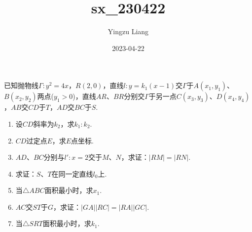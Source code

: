 \documentclass[UTF8, 12pt, a4paper]{ctexart}
\title{sx_230422}
\author{Yingzu Liang}
\date{2023-04-22}
\begin{document}
已知抛物线$\Gamma:y^2=4x$，$R\left(2,0 \right)$，直线$l:y=k_1\left(x-1 \right)$交$\Gamma$于$A\left(x_1,y_1 \right)$、$B\left(x_2,y_2 \right)$两点($y_1>0$)，直线$AR$、$BR$分别交$\Gamma$于另一点$C\left(x_3,y_3 \right)$、$D\left(x_4,y_4 \right)$，$AB$交$CD$于$T$，$AD$交$BC$于$S$.
\begin{enumerate}[itemsep=0pt, partopsep=0pt, parsep=\parskip, topsep=0pt]
\item 设$CD$斜率为$k_2$，求$k_1:k_2$.
\item $CD$过定点$E$，求$E$点坐标.
\item $AD$、$BC$分别与$l':x=2$交于$M$、$N$，求证：$\left|RM \right|=\left|RN \right|$.
\item 求证：$S$、$T$在同一定直线$l_0$上.
\item 当$\triangle ABC$面积最小时，求$x_1$.
\item $AC$交$ST$于$G$，求证：$\left|GA \right|\left|RC \right|=\left|RA \right|\left|GC \right|$.
\item 当$\triangle SRT$面积最小时，求$k_1$.
\end{enumerate}
\end{document}
